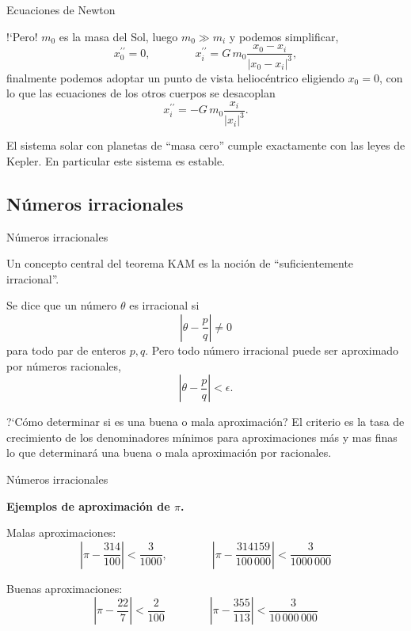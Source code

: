 \documentclass[8pt]{beamer}
\renewcommand{\>}{\rangle}
\newcommand{\<}{\langle}
\newcommand{\be}{\begin{equation}}
\newcommand{\ee}{\end{equation}}
\begin{document}
\begin{frame}{Ecuaciones de Newton}
\vspace{-1cm}

!`Pero! $m_{0}$ es la masa del Sol, luego $m_{0} \gg m_{i}$ y podemos simplificar,
\be 
	x_{0}^{\prime \prime} = 0, \qquad \qquad x_{i}^{\prime \prime} =  G\, m_{0} \frac{x_{0}-x_{i}}{|x_{0}-x_{i}|^{3}}, \nonumber 
\ee
finalmente podemos adoptar un punto de vista heliocéntrico eligiendo $x_{0}=0$, con lo que las ecuaciones de los otros cuerpos se desacoplan
\be 
	x_{i}^{\prime \prime} =  -G\, m_{0} \frac{x_{i}}{|x_{i}|^{3}}.
	\nonumber
\ee

El sistema solar con planetas de ``masa cero'' cumple exactamente con las leyes de Kepler.
En particular este sistema es estable.

\end{frame}

\subsection[Números irracionales]{Números irracionales}

\begin{frame}{Números irracionales}
\vspace{0cm}

\begin{mybluebox}{}
Un concepto central del teorema KAM es la noción de ``suficientemente irracional''.
\end{mybluebox}

Se dice que un número $\theta$ es irracional si $$\left|\theta - \frac{p}{q} \right| \neq 0$$ para todo par de enteros $p, q$.
Pero todo número irracional puede ser aproximado por números racionales,
\be 
	\left|\theta - \frac{p}{q} \right| < \epsilon . \nonumber
\ee

\vspace{0.5cm}

\begin{mybox}{?`Cómo determinar si es una buena o mala aproximación?}
El criterio es la tasa de crecimiento de los denominadores mínimos para aproximaciones más y mas finas lo que determinará una buena o mala aproximación por racionales.
\end{mybox}
\end{frame}

\begin{frame}{Números irracionales}
\vspace{-1cm}

{\bf Ejemplos de aproximación de $\pi$.}
\bigskip

Malas aproximaciones:\\
\be 
	\left|\pi - \frac{314}{100} \right| < \frac{3}{1000}, 
	\qquad \qquad 
	\left|\pi - \frac{314159}{100\, 000} \right| < \frac{3}{1000\, 000}
	\nonumber
\ee
\vspace{0.5cm}

Buenas aproximaciones:\\
\be 
	\left|\pi - \frac{22}{7} \right| < \frac{2}{100}
	\qquad \qquad
	\left|\pi - \frac{355}{113} \right| < \frac{3}{10\, 000\, 000}
	\nonumber
\ee

\end{frame}
\end{document}

